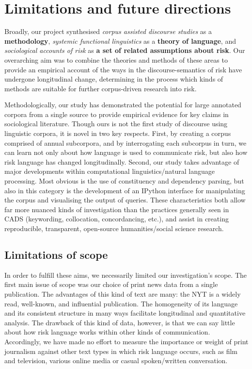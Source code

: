 
\chapter{Limitations and future directions}

Broadly, our project synthesised \emph{corpus assisted discourse studies} as a \textbf{methodology}, \emph{systemic functional linguistics} as a \textbf{theory of language}, and \emph{sociological accounts of risk} as \textbf{a set of related assumptions about risk}. Our overarching aim was to combine the theories and methods of these areas to provide an empirical account of the ways in the discourse-semantics of risk have undergone longitudinal change, determining in the process which kinds of methods are suitable for further corpus-driven research into risk.

Methodologically, our study has demonstrated the potential for large annotated corpora from a single source to provide empirical evidence for key claims in sociological literature. Though ours is not the first study of discourse using linguistic corpora, it is novel in two key respects. First, by creating a corpus comprised of annual subcorpora, and by interrogating each subcorpus in turn, we can learn not only about how language is used to communicate risk, but also how risk language has changed longitudinally. Second, our study takes advantage of major developments within computational linguistics\slash natural language processing. Most obvious is the use of constituency and dependency parsing, but also in this category is the development of an IPython interface for manipulating the corpus and visualising the output of queries. These characteristics both allow far more nuanced kinds of investigation than the practices generally seen in CADS (keywording, collocation, concordancing, etc.), and assist in creating reproducible, transparent, open-source humanities\slash social science research.

\section{Limitations of scope}

In order to fulfill these aims, we necessarily limited our investigation's scope. The first main issue of scope was our choice of print news data from a single publication. The advantages of this kind of text are many: the NYT is a widely read, well-known, and influential publication. The homogeneity of its language and its consistent structure in many ways facilitate longitudinal and quantitative analysis. The drawback of this kind of data, however, is that we can say little about how risk language works within other kinds of communication. Accordingly, we have made no effort to measure the importance or weight of print journalism against other text types in which risk language occurs, such as film and television, various online media or casual spoken\slash written conversation.

